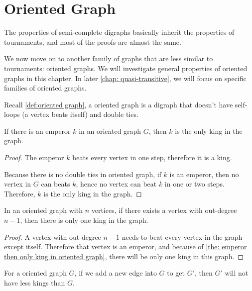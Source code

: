 \chapter{Oriented Graph}\label{chap: general oriented graph}

The properties of semi-complete digraphs basically inherit
the properties of tournaments,
and most of the proofs are almost the same.

We now move on to another family of graphs that are less
similar to tournaments: oriented graphs.
We will investigate general properties of oriented graphs
in this chapter.
In later \cref{chap: quasi-transitive}, we will focus on
specific families of oriented graphs.

Recall \cref{def:oriented graph},
a oriented graph is a digraph that doesn't
have self-loops (a vertex beats itself)
and double ties.

\begin{theorem}\label{the: emperor then only king in oriented graph}
  If there is an emperor \(k\) in an oriented graph \(G\),
  then \(k\) is the only king in the graph.
\end{theorem}
\begin{proof}
  The emperor \(k\) beats every vertex in one step,
  therefore it is a king.

  Because there is no double ties in oriented graph,
  if \(k\) is an emperor,
  then no vertex in \(G\) can beats \(k\),
  hence no vertex can beat \(k\) in one or two steps.
  Therefore, \(k\) is the only king in the graph.
\end{proof}

\begin{corollary}\label{the: if vertex with out-degree n-1 then only one king}
  In an oriented graph with \(n\) vertices,
  if there exists a vertex with out-degree \(n-1\),
  then there is only one king in the graph.
\end{corollary}

\begin{proof}
  A vertex with out-degree \(n-1\) needs to beat every vertex
  in the graph except itself.
  Therefore that vertex is an emperor,
  and because of \cref{the: emperor then only king in oriented graph},
  there will be only one king in this graph.
\end{proof}

\begin{lemma}\label{the: add edge only add king}
  For a oriented graph \(G\),
  if we add a new edge into \(G\) to get \(G'\),
  then \(G'\) will not have less kings than \(G\).
\end{lemma}

